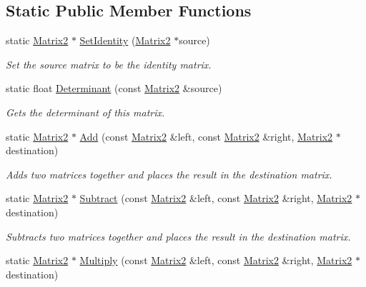 \subsection*{Static Public Member Functions}
\begin{DoxyCompactItemize}
\item 
static \hyperlink{class_flounder_1_1_matrix2}{Matrix2} $\ast$ \hyperlink{class_flounder_1_1_matrix2_a4033d2130af3941798f2d3c1a17fd26c}{Set\+Identity} (\hyperlink{class_flounder_1_1_matrix2}{Matrix2} $\ast$source)
\begin{DoxyCompactList}\small\item\em Set the source matrix to be the identity matrix. \end{DoxyCompactList}\item 
static float \hyperlink{class_flounder_1_1_matrix2_a947cd864cfd4fd94dcfefcad3781838e}{Determinant} (const \hyperlink{class_flounder_1_1_matrix2}{Matrix2} \&source)
\begin{DoxyCompactList}\small\item\em Gets the determinant of this matrix. \end{DoxyCompactList}\item 
static \hyperlink{class_flounder_1_1_matrix2}{Matrix2} $\ast$ \hyperlink{class_flounder_1_1_matrix2_a319825e3bda48c3e843be127f2ce9b50}{Add} (const \hyperlink{class_flounder_1_1_matrix2}{Matrix2} \&left, const \hyperlink{class_flounder_1_1_matrix2}{Matrix2} \&right, \hyperlink{class_flounder_1_1_matrix2}{Matrix2} $\ast$destination)
\begin{DoxyCompactList}\small\item\em Adds two matrices together and places the result in the destination matrix. \end{DoxyCompactList}\item 
static \hyperlink{class_flounder_1_1_matrix2}{Matrix2} $\ast$ \hyperlink{class_flounder_1_1_matrix2_a1467f657660a194b10f6af6f76df35ff}{Subtract} (const \hyperlink{class_flounder_1_1_matrix2}{Matrix2} \&left, const \hyperlink{class_flounder_1_1_matrix2}{Matrix2} \&right, \hyperlink{class_flounder_1_1_matrix2}{Matrix2} $\ast$destination)
\begin{DoxyCompactList}\small\item\em Subtracts two matrices together and places the result in the destination matrix. \end{DoxyCompactList}\item 
static \hyperlink{class_flounder_1_1_matrix2}{Matrix2} $\ast$ \hyperlink{class_flounder_1_1_matrix2_a6084cf89e1f8f64041ca5a852e9888ce}{Multiply} (const \hyperlink{class_flounder_1_1_matrix2}{Matrix2} \&left, const \hyperlink{class_flounder_1_1_matrix2}{Matrix2} \&right, \hyperlink{class_flounder_1_1_matrix2}{Matrix2} $\ast$destination)

\end{DoxyCompactItemize}
